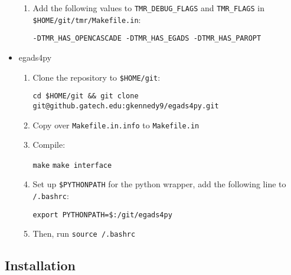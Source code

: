 \documentclass{article}
\begin{document}
\begin{itemize}
\begin{enumerate}
        \item Add the following values to \texttt{TMR\string_DEBUG\string_FLAGS} and
        \texttt{TMR\string_FLAGS} in \texttt{\$HOME/git/tmr/Makefile.in}:

        \texttt{-DTMR\string_HAS\string_OPENCASCADE -DTMR\string_HAS\string_EGADS
        -DTMR\string_HAS\string_PAROPT}


    \end{enumerate}

    \item egads4py

    \begin{enumerate}
        \item Clone the repository to \texttt{\$HOME/git}:

        \texttt{cd \$HOME/git \&\& git clone git@github.gatech.edu:gkennedy9/egads4py.git}

        \item Copy over \texttt{Makefile.in.info} to \texttt{Makefile.in}

        \item Compile:

        \texttt{make}
        \texttt{make interface}

        \item Set up \texttt{\$PYTHONPATH} for the python wrapper,
        add the following line to \texttt{\texttildelow/.bashrc}:

        \texttt{export PYTHONPATH=\$:\texttildelow/git/egads4py}

        \item Then, run \texttt{source \texttildelow/.bashrc}

    \end{enumerate}

\end{itemize}


\subsection{Installation}
\end{document}
